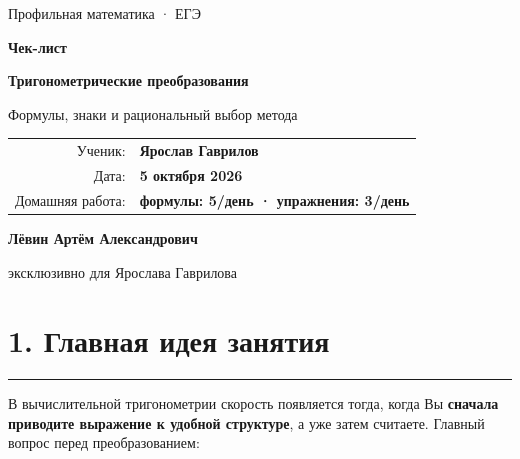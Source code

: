 \documentclass[a4paper,12pt]{article}
\newcommand{\sectionline}{\vspace{-1mm}\noindent\color{accent}\rule{\linewidth}{0.7pt}\color{textgray}\vspace{2mm}}
\newcommand{\key}[1]{\textbf{\color{darkaccent}#1}}
\begin{document}
\color{textgray}

\thispagestyle{empty}
\begin{center}
\vspace*{22mm}
{\Large\color{softgray}Профильная математика · ЕГЭ\par}
\vspace{9mm}
{\fontsize{29}{34}\selectfont\bfseries\color{darkaccent}Чек-лист\par}
\vspace{4mm}
{\fontsize{20}{24}\selectfont\bfseries Тригонометрические преобразования\par}
\vspace{3mm}
{\large Формулы, знаки и рациональный выбор метода\par}

\vspace{18mm}
\begin{tabular}{@{}rl@{}}
\color{softgray}Ученик: & \textbf{Ярослав Гаврилов}\\[2mm]
\color{softgray}Дата: & \textbf{5 октября 2026}\\[2mm]
\color{softgray}Домашняя работа: & \textbf{формулы: 5/день · упражнения: 3/день}
\end{tabular}

\vfill
{\large\bfseries\color{darkaccent}Лёвин Артём Александрович\par}
\vspace{1mm}
{\normalsize эксклюзивно для Ярослава Гаврилова\par}
\vspace{12mm}

\end{center}
\clearpage

\section*{1. Главная идея занятия}
\sectionline

В вычислительной тригонометрии скорость появляется тогда, когда Вы \key{сначала приводите выражение к удобной структуре}, а уже затем считаете. Главный вопрос перед преобразованием:
\end{document}
